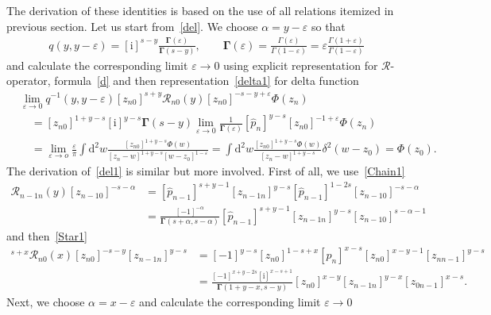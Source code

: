 \documentclass[10pt,a4paper]{amsart}
\renewcommand{\imath}{\mathrm{i}}
\numberwithin{equation}{section}
\begin{document}
The derivation of these identities is based on the use
of all relations itemized in previous section.
Let us start from~\eqref{del}.
We choose $\alpha = y-\varepsilon$ so that
\begin{align*}
q(y ,y-\varepsilon) =
[\imath]^{s-y} \frac{\mathbf{\Gamma}(\varepsilon)}{\mathbf{\Gamma}(s-y)}, \qquad
\mathbf{\Gamma}(\varepsilon) =
\frac{\Gamma(\varepsilon)}{\Gamma(1 - \varepsilon)} =
\varepsilon \frac{\Gamma(1+\varepsilon)}{\Gamma(1 - \varepsilon)}
\end{align*}
and calculate the corresponding limit $\varepsilon\to 0$ using explicit
representation for $\mathcal{R}$-operator, formula~\eqref{d} and
then representation~\eqref{delta1} for delta function
\begin{align*}
&
\lim\limits_{\varepsilon\to 0}
q^{-1}(y,y-\varepsilon)
[z_{n0}]^{s+y} \mathcal{R}_{n 0}(y) [z_{n0}]^{-s-y+\varepsilon} \Phi(z_n) \\
&\quad =
[z_{n0}]^{1+y-s} [\imath]^{y-s} \mathbf{\Gamma}(s-y)
\lim\limits_{\varepsilon\to 0}
\frac{1}
{\mathbf{\Gamma}(\varepsilon)}
[\hat{p}_n]^{y-s} [z_{n0}]^{-1+\varepsilon} \Phi(z_n) \\
&\quad =
\lim\limits_{\varepsilon\to o} \frac{\varepsilon}{\pi}
\int \mathrm{d}^2 w \frac{[z_{n0}]^{1+y-s} \Phi(w)}{[z_n-w]^{1+y-s} [w-z_0]^{1-\varepsilon}} =
\int \mathrm{d}^2 w \frac{[z_{n0}]^{1+y-s} \Phi(w)}{[z_n-w]^{1+y-s}}
\delta^2(w-z_0) = \Phi(z_0) .
\end{align*}
The derivation of~\eqref{del1} is similar but more involved.
First of all, we use~\eqref{Chain1}
\begin{align*}
\mathcal{R}_{n-1 n}(y) [z_{n-1 0}]^{-s-\alpha} & = [\hat{p}_{n-1}]^{s+y-1} [z_{n-1 n}]^{y-s}
[\hat{p}_{n-1}]^{1-2s} [z_{n-1 0}]^{-s-\alpha} \\
& = 	
\frac{[-1]^{-\alpha}}{\mathbf{\Gamma}(s+\alpha,s-\alpha)}
[\hat{p}_{n-1}]^{s+y-1} [z_{n-1 n}]^{y-s}
[z_{n-1 0}]^{s-\alpha-1}
\end{align*}
and then~\eqref{Star1}
\begin{align*}
[z_{n0}]^{s+x} \mathcal{R}_{n 0}(x) [z_{n0}]^{-s-y} [z_{n-1 n}]^{y-s} & =
[-1]^{y-s}
[z_{n 0}]^{1-s+x} [p_n]^{x-s} [z_{n 0}]^{x-y-1} [z_{n n-1}]^{y-s} \\
& =
\frac{[-1]^{x+y-2s} [\imath]^{x-s+1}}
{\mathbf{\Gamma}(1+y-x,s-y)}
[z_{n0}]^{x-y} [z_{n-1 n}]^{y-x} [z_{0 n-1}]^{x-s} .
\end{align*}
Next, we choose $\alpha = x-\varepsilon$
and calculate the corresponding limit $\varepsilon\to 0$
\end{document}
